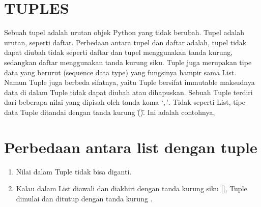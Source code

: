 \section{TUPLES}
Sebuah tupel adalah urutan objek Python yang tidak berubah. Tupel adalah urutan, seperti daftar. Perbedaan antara tupel dan daftar adalah, tupel tidak dapat diubah tidak seperti daftar dan tupel menggunakan tanda kurung, sedangkan daftar menggunakan tanda kurung siku. 
Tuple juga merupakan tipe data yang berurut (sequence data type) yang fungsinya hampir sama List. Namun Tuple juga berbeda sifatnya, yaitu Tuple bersifat immutable maksudnya data di dalam Tuple tidak dapat diubah atau dihapuskan. Sebuah Tuple terdiri dari beberapa nilai yang dipisah oleh tanda koma \(‘,’\). Tidak seperti List, tipe data Tuple ditandai dengan tanda kurung \"()\".
Ini adalah contohnya, 

\section{Perbedaan antara list dengan tuple} 
\begin{enumerate}
\item Nilai dalam Tuple tidak bisa diganti. 
\item Kalau dalam List diawali dan diakhiri dengan tanda kurung siku [], Tuple dimulai dan ditutup dengan tanda kurung \(\). 
\end{enumerate}


